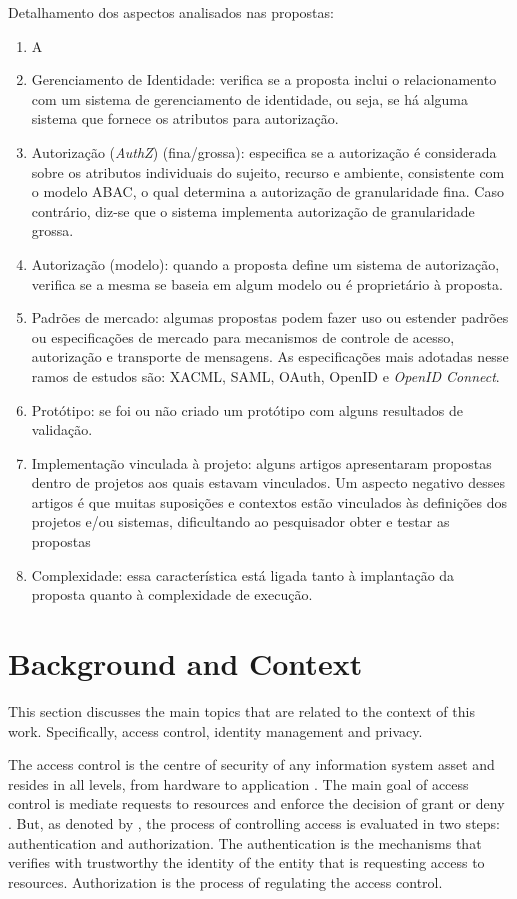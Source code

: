 \documentclass{doublecol-new}
\begin{document}
Detalhamento dos aspectos analisados nas propostas:
\begin{enumerate}
	\item A
	\item Gerenciamento de Identidade: verifica se a proposta inclui o relacionamento com um sistema de gerenciamento de identidade, ou seja, se há alguma sistema que fornece os atributos para autorização.
	\item Autorização (\textit{AuthZ}) (fina/grossa): especifica se a autorização é considerada sobre os atributos individuais do sujeito, recurso e ambiente, consistente com o modelo ABAC, o qual determina a autorização de granularidade fina. Caso contrário, diz-se que o sistema implementa autorização de granularidade grossa.
	\item Autorização (modelo): quando a proposta define um sistema de autorização, verifica se a mesma se baseia em algum modelo ou é proprietário à proposta.
	\item Padrões de mercado: algumas propostas podem fazer uso ou estender padrões ou especificações de mercado para mecanismos de controle de acesso, autorização e transporte de mensagens. As especificações mais adotadas nesse ramos de estudos são: XACML, SAML, OAuth, OpenID e \textit{OpenID Connect}.
	\item Protótipo: se foi ou não criado um protótipo com alguns resultados de validação.
	\item Implementação vinculada à projeto: alguns artigos apresentaram propostas dentro de projetos aos quais estavam vinculados. Um aspecto negativo desses artigos é que muitas suposições e contextos estão vinculados às definições dos projetos e/ou sistemas, dificultando ao pesquisador obter e testar as propostas
	\item Complexidade: essa característica está ligada tanto à implantação da proposta quanto à complexidade de execução.
\end{enumerate}


\section{Background and Context}
This section discusses the main topics that are related to the context of this work. Specifically, access control, identity management and privacy.

The access control is the centre of security of any information system asset and resides in all levels, from hardware to application \citep{anderson2008security}. The main goal of access control is mediate requests to resources and enforce the decision of grant or deny \citep{samarati2001access}. But, as denoted by \cite{gollmann2011compsecurity}, the process of controlling access is evaluated in two steps: authentication and authorization. The authentication is the mechanisms that verifies with trustworthy the identity of the entity that is requesting access to resources. Authorization is the process of regulating the access control.
\end{document}
